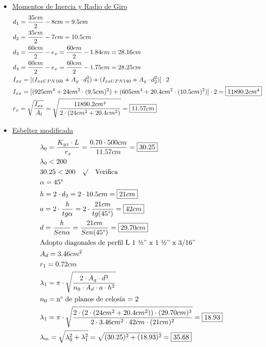 \begin{enumerate}
\begin{itemize}
\item \underline{Momentos de Inercia y Radio de Giro}
\begin{align*}
& d_1 = \frac{35cm}{2} - 8cm = 9.5cm\\
& d_2 = \frac{35cm}{2} - 7cm = 10.5cm\\
& d_3 = \frac{60cm}{2} - e_x = \frac{60cm}{2} - 1.84cm = 28.16cm\\
& d_4 = \frac{60cm}{2} - e_x = \frac{60cm}{2} - 1.75cm = 28.25cm\\
& I_{xx} = [(I_{xx UPN160}+A_g \cdot d_1^2)+ (I_{xx UPN140}+A_g \cdot d_2^2)] \cdot 2\\
& I_{xx} = [(925cm^4+24cm^2 \cdot (9.5cm)^2)+ (605cm^4+20.4cm^2 \cdot (10.5cm)^2)] \cdot 2 = \framebox{$11890.2cm^4$}\\
& r_x = \sqrt{\frac{I_{xx}}{A_t}} = \sqrt{\frac{11890.2cm^4}{2\cdot(24cm^2 + 20.4cm^2)}} = \framebox{$11.57cm$}
\end{align*}

\item \underline{Esbeltez modificada}
\begin{align*}
& \lambda_0 = \frac{K_{yz} \cdot L}{r_x} = \frac{0.70 \cdot 500cm}{11.57cm} = \framebox{$30.25$}\\
& \lambda_0 < 200 \\
& 30.25 < 200 \quad \surd \quad \text{Verifica} \\
& \alpha = 45\text{°}\\
& h = 2 \cdot d_2 = 2 \cdot 10.5cm = \framebox{$21cm$} \\
& a = 2 \cdot \frac{h}{tg \alpha} = 2 \cdot \frac{21cm}{tg(45\text{°})} = \framebox{$42cm$}\\
& d = \frac{h}{Sen\alpha} = \frac{21cm}{Sen(45\text{°})} = \framebox{$29.70cm$}\\
& \text{Adopto diagonales de perfil L 1 ½” x 1 ½” x 3/16”} \\
& A_d = 3.46cm^2 \\
& r_1 = 0.72cm \\
& \lambda_1 = \pi \cdot \sqrt{\frac{2 \cdot A_g \cdot d^3}{n_0 \cdot A_d \cdot a \cdot h^2}} \\
& n_0 = \text{n° de planos de celosía = 2} \\
& \lambda_1 = \pi \cdot \sqrt{\frac{2 \cdot (2\cdot(24cm^2+20.4cm^2)) \cdot (29.70cm)^3}{2 \cdot 3.46cm^2 \cdot 42cm \cdot (21cm)^2}} = \framebox{$18.93$}\\
& \lambda_m = \sqrt{\lambda_0^2 + \lambda_1^2} = \sqrt{(30.25)^2 + (18.93)^2} = \framebox{$35.68$}
\end{align*}


\end{itemize}
\end{enumerate}

